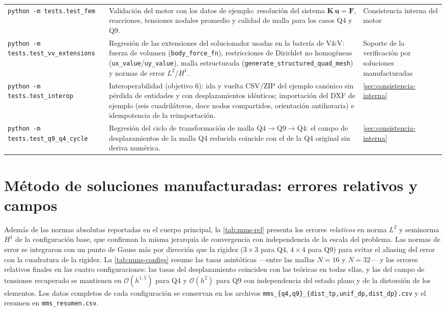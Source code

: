 {\begin{longtable}{@{}>{\footnotesize\raggedright\arraybackslash}p{4.3cm} >{\footnotesize\raggedright\arraybackslash}p{5.1cm} >{\footnotesize\raggedright\arraybackslash}p{4.1cm}@{}}
\addlinespace
\texttt{python -m tests.test\_fem} &
Validación del motor con los datos de ejemplo: resolución del sistema $\bm{K}\,\bm{u}=\bm{F}$, reacciones, tensiones nodales promedio y calidad de malla para los casos Q4 y Q9. &
Consistencia interna del motor \\
\addlinespace
\texttt{python -m tests.test\_vv\_extensions} &
Regresión de las extensiones del solucionador usadas en la batería de V\&V: fuerza de volumen (\texttt{body\_force\_fn}), restricciones de Dirichlet no homogéneas (\texttt{ux\_value}/\texttt{uy\_value}), malla estructurada (\texttt{generate\_structured\_quad\_mesh}) y normas de error $L^2$/$H^1$. &
Soporte de la verificación por soluciones manufacturadas \\
\addlinespace
\texttt{python -m tests.test\_interop} &
Interoperabilidad (objetivo 6): ida y vuelta CSV/ZIP del ejemplo canónico sin pérdida de entidades y con desplazamientos idénticos; importación del DXF de ejemplo (seis cuadriláteros, doce nodos compartidos, orientación antihoraria) e idempotencia de la reimportación. &
\autoref{sec:consistencia-interna} \\
\addlinespace
\texttt{python -m tests.test\_q9\_q4\_cycle} &
Regresión del ciclo de transformación de malla $\text{Q4}\rightarrow\text{Q9}\rightarrow\text{Q4}$: el campo de desplazamientos de la malla Q4 reducida coincide con el de la Q4 original sin deriva numérica. &
\autoref{sec:consistencia-interna} \\
\end{longtable}}



\section{Método de soluciones manufacturadas: errores relativos y campos}

Además de las normas absolutas reportadas en el cuerpo principal, la \autoref{tab:mms-rel} presenta los errores \emph{relativos} en norma $L^2$ y seminorma $H^1$ de la configuración base, que confirman la misma jerarquía de convergencia con independencia de la escala del problema. Las normas de error se integraron con un punto de Gauss más por dirección que la rigidez ($3\times 3$ para Q4, $4\times 4$ para Q9) para evitar el aliasing del error con la cuadratura de la rigidez. La \autoref{tab:mms-configs} resume las tasas asintóticas ---entre las mallas $N=16$ y $N=32$--- y los errores relativos finales en las cuatro configuraciones: las tasas del desplazamiento coinciden con las teóricas en todas ellas, y las del campo de tensiones recuperado se mantienen en $\mathcal{O}(h^{1{,}5})$ para Q4 y $\mathcal{O}(h^{2})$ para Q9 con independencia del estado plano y de la distorsión de los elementos. Los datos completos de cada configuración se conservan en los archivos \texttt{mms\_\{q4,q9\}\_\{dist\_tp,unif\_dp,dist\_dp\}.csv} y el resumen en \texttt{mms\_resumen.csv}.

